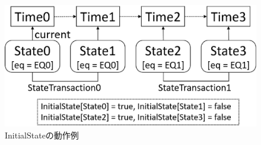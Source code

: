 \documentclass[12pt,a4paper]{jbook}
\begin{document}
\begin{figure}[htb]
\centering
\includegraphics[width=400pt]{./fig/InitialState.eps}
\caption{InitialStateの動作例}
\label{fig:InitialState}
\end{figure}
\end{document}
